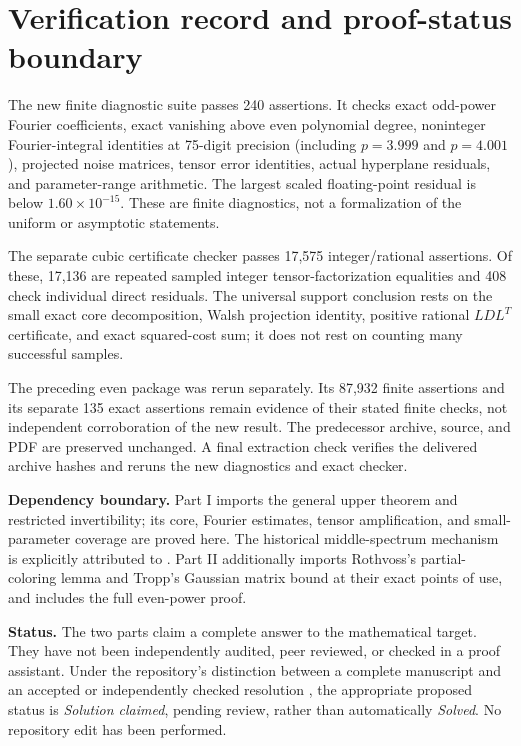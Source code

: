 \documentclass[11pt]{article}
\theoremstyle{remark}\newtheorem{remark}[theorem]{Remark}
\begin{document}
\section{Verification record and proof-status boundary}\label{sec:verification}
The new finite diagnostic suite passes 240 assertions. It checks exact odd-power Fourier coefficients, exact vanishing above even polynomial degree, noninteger Fourier-integral identities at 75-digit precision (including $p=3.999$ and $p=4.001$), projected noise matrices, tensor error identities, actual hyperplane residuals, and parameter-range arithmetic. The largest scaled floating-point residual is below $1.60\times10^{-15}$. These are finite diagnostics, not a formalization of the uniform or asymptotic statements.

The separate cubic certificate checker passes 17,575 integer/rational assertions. Of these, 17,136 are repeated sampled integer tensor-factorization equalities and 408 check individual direct residuals. The universal support conclusion rests on the small exact core decomposition, Walsh projection identity, positive rational $LDL^T$ certificate, and exact squared-cost sum; it does not rest on counting many successful samples.

The preceding even package was rerun separately. Its 87,932 finite assertions and its separate 135 exact assertions remain evidence of their stated finite checks, not independent corroboration of the new result. The predecessor archive, source, and PDF are preserved unchanged. A final extraction check verifies the delivered archive hashes and reruns the new diagnostics and exact checker.

\textbf{Dependency boundary.} Part I imports the general upper theorem and restricted invertibility; its core, Fourier estimates, tensor amplification, and small-parameter coverage are proved here. The historical middle-spectrum mechanism is explicitly attributed to \cite{lww}. Part II additionally imports Rothvoss's partial-coloring lemma and Tropp's Gaussian matrix bound at their exact points of use, and includes the full even-power proof.

\textbf{Status.} The two parts claim a complete answer to the mathematical target. They have not been independently audited, peer reviewed, or checked in a proof assistant. Under the repository's distinction between a complete manuscript and an accepted or independently checked resolution \cite{status}, the appropriate proposed status is \emph{Solution claimed}, pending review, rather than automatically \emph{Solved}. No repository edit has been performed.
\end{document}
